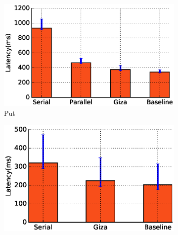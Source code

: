 
\begin{figure}[t]
    \begin{subfigure}{0.45\textwidth}
      \includegraphics[width=\linewidth]{plots/giza_lat_put}

      \caption{Put}
      \label{fig:eval_giza_put}
    \end{subfigure}
%
    \begin{subfigure}{0.45\textwidth}
      \includegraphics[width=\linewidth]{plots/giza_lat_get}


\end{subfigure}
\end{figure}
